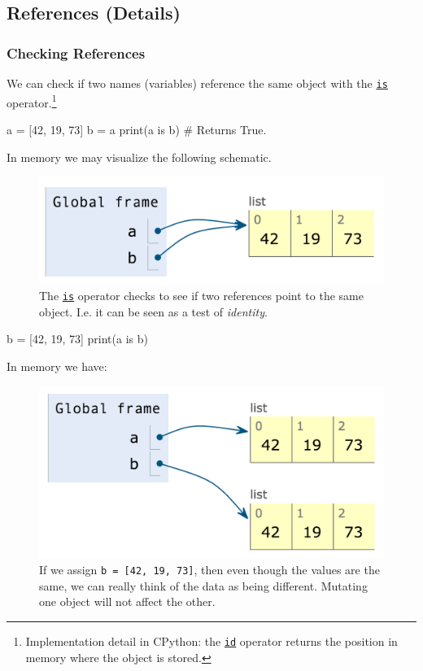 \documentclass[12pt,letterpaper,twoside]{article}
\begin{document}
\subsection{References (Details)}
\subsubsection{Checking References}
We can check if two names (variables) reference the same object with the
\href{https://docs.python.org/3/library/operator.html}{\texttt{is}} operator.\footnote{
Implementation detail in CPython: 
the \href{https://docs.python.org/3/library/functions.html#id}{\texttt{id}} operator 
returns the position in memory where the object is stored.
}

\begin{python}
a = [42, 19, 73]
b = a
print(a is b)  # Returns True.
\end{python}

In memory we may visualize the following schematic.

\begin{figure}[h]
\centering
\includegraphics[scale=0.5]{fig/list-1.png}
\caption{The \href{https://docs.python.org/3/library/operator.html}{\texttt{is}} operator checks to see if two references point to the same object. I.e. it can be seen as a test of \emph{identity}.}
\end{figure}

\begin{python}
b = [42, 19, 73]
print(a is b)
\end{python}

In memory we have:

\begin{figure}[h]
\centering
\includegraphics[scale=0.35]{fig/list-2.png}
\caption{If we assign \texttt{b = [42, 19, 73]}, then even though the values are the same, we can really think of the data as being different. Mutating one object will not affect the other.}
\end{figure}
\end{document}
